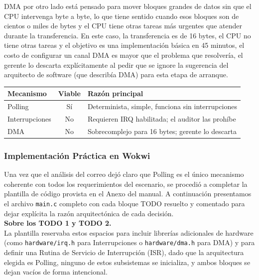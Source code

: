 \documentclass[12pt,letterpaper]{article}
\begin{document}
DMA por otro lado está pensado para mover bloques grandes de datos sin que el CPU intervenga byte a byte, lo que
tiene sentido cuando esos bloques son de cientos o miles de bytes y el CPU tiene otras tareas más urgentes que
atender durante la transferencia. En este caso, la transferencia es de 16 bytes, el CPU no tiene otras tareas y
el objetivo es una implementación básica en 45 minutos, el costo de configurar un canal DMA es mayor que el
problema que resolvería, el gerente lo descarta explícitamente al pedir que se ignore la sugerencia del
arquitecto de software (que describía DMA) para esta etapa de arranque.

\begin{center}
  \begin{tabular}{|l|c|l|}
    \hline
    \textbf{Mecanismo} & \textbf{Viable} & \textbf{Razón principal} \\
    \hline
    Polling             & Sí  & Determinista, simple, funciona sin interrupciones \\
    Interrupciones      & No  & Requieren IRQ habilitada; el auditor las prohíbe \\
    DMA                 & No  & Sobrecomplejo para 16 bytes; gerente lo descarta \\
    \hline
  \end{tabular}
\end{center}

\subsubsection*{Implementación Práctica en Wokwi}
Una vez que el análisis del correo dejó claro que Polling es el único mecanismo coherente con todos los
requerimientos del escenario, se procedió a completar la plantilla de código provista en el Anexo del manual.
A continuación presentamos el archivo \texttt{main.c} completo con cada bloque TODO resuelto y comentado para
dejar explícita la razón arquitectónica de cada decisión.\\

\textbf{Sobre los TODO 1 y TODO 2.}\\
La plantilla reservaba estos espacios para incluir librerías adicionales de hardware
(como \texttt{hardware/irq.h} para Interrupciones o \texttt{hardware/dma.h} para DMA) y para definir una Rutina
de Servicio de Interrupción (ISR), dado que la arquitectura elegida es Polling, ninguno de estos subsistemas se
inicializa, y ambos bloques se dejan vacíos de forma intencional.\\
\end{document}
